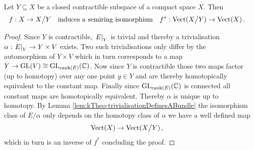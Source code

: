 \begin{lemma}
	\label{lem:kTheo-collapsingOfContractibleSubspace}
	Let $Y\subseteq X$ be a closed contractible subspace of a compact space $X$. Then 
	\begin{equation*}
		f:X\to X\big/ Y \quad \text{induces a semiring isomorphism}\quad f^*: \operatorname{\mathrm{Vect}}(X\big/Y) \to \operatorname{\mathrm{Vect}}(X)\,.
	\end{equation*}
\end{lemma}
\begin{proof}
	Since $Y$ is contractible, $\left.E\right|_{Y}$ is trivial and thereby a trivialisation $\alpha:\left.E\right|_{Y}\to Y\times V$ exists. Two such trivialisations only differ by the automorphism  of $Y\times V$ which in turn corresponds to a map $Y\to \mathrm{GL}(V)\cong \mathrm{GL}_{\operatorname{\mathrm{rank}}(E)}(\mathbb{C})$. Now since $Y$ is contractible those two maps factor (up to homotopy) over any one point $y\in Y$ and are thereby homotopically equivalent to the constant map. Finally since $\mathrm{GL}_{\operatorname{\mathrm{rank}}(E)}(\mathbb{C})$ is connected all constant maps are homotopically equivalent. Thereby $\alpha$ is unique up to homotopy. By Lemma \ref{lem:kTheo-trivialisationDefinesABundle} the isomorphism class of $E\big/ \alpha$ only depends on the homotopy class of $\alpha$ we have a well defined map 
	\begin{equation*}
		\operatorname{\mathrm{Vect}}(X)\to \operatorname{\mathrm{Vect}}(X\big/ Y)\,,
	\end{equation*}which in turn is an inverse of $f^*$ concluding the proof.
\end{proof}


